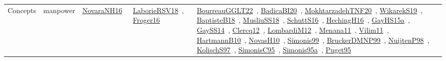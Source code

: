{\begin{longtable}{lp{3cm}>{\raggedright\arraybackslash}p{6cm}>{\raggedright\arraybackslash}p{6cm}>{\raggedright\arraybackslash}p{8cm}}
Concepts & manpower & \href{works/NovaraNH16.pdf}{NovaraNH16}~\cite{NovaraNH16} & \href{works/LaborieRSV18.pdf}{LaborieRSV18}~\cite{LaborieRSV18}, \href{works/Froger16.pdf}{Froger16}~\cite{Froger16} & \href{works/BourreauGGLT22.pdf}{BourreauGGLT22}~\cite{BourreauGGLT22}, \href{works/BadicaBI20.pdf}{BadicaBI20}~\cite{BadicaBI20}, \href{works/MokhtarzadehTNF20.pdf}{MokhtarzadehTNF20}~\cite{MokhtarzadehTNF20}, \href{works/WikarekS19.pdf}{WikarekS19}~\cite{WikarekS19}, \href{works/BaptisteB18.pdf}{BaptisteB18}~\cite{BaptisteB18}, \href{works/MusliuSS18.pdf}{MusliuSS18}~\cite{MusliuSS18}, \href{works/SchuttS16.pdf}{SchuttS16}~\cite{SchuttS16}, \href{works/HechingH16.pdf}{HechingH16}~\cite{HechingH16}, \href{works/GayHS15a.pdf}{GayHS15a}~\cite{GayHS15a}, \href{works/GaySS14.pdf}{GaySS14}~\cite{GaySS14}, \href{works/Clercq12.pdf}{Clercq12}~\cite{Clercq12}, \href{works/LombardiM12.pdf}{LombardiM12}~\cite{LombardiM12}, \href{works/Menana11.pdf}{Menana11}~\cite{Menana11}, \href{works/Vilim11.pdf}{Vilim11}~\cite{Vilim11}, \href{works/HartmannB10.pdf}{HartmannB10}~\cite{HartmannB10}, \href{works/NovasH10.pdf}{NovasH10}~\cite{NovasH10}, \href{works/Simonis99.pdf}{Simonis99}~\cite{Simonis99}, \href{works/BruckerDMNP99.pdf}{BruckerDMNP99}~\cite{BruckerDMNP99}, \href{works/NuijtenP98.pdf}{NuijtenP98}~\cite{NuijtenP98}, \href{works/KolischS97.pdf}{KolischS97}~\cite{KolischS97}, \href{works/SimonisC95.pdf}{SimonisC95}~\cite{SimonisC95}, \href{works/Simonis95a.pdf}{Simonis95a}~\cite{Simonis95a}, \href{works/Puget95.pdf}{Puget95}~\cite{Puget95}\\

\end{longtable}}
